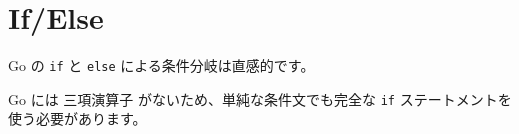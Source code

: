 \section{If/Else}

Go の \texttt{if} と \texttt{else} による条件分岐は直感的です。




Go には 三項演算子 がないため、単純な条件文でも完全な \texttt{if} ステートメントを 使う必要があります。